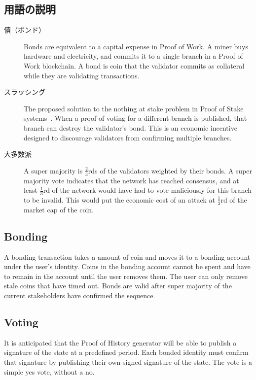 \documentclass[12pt]{ltjsarticle}
\begin{document}
\subsection{用語の説明}
\begin{description}

\item[債（ボンド）]
Bonds are equivalent to a capital expense in Proof of Work. A miner buys hardware and electricity, and commits it to a single branch in a Proof of Work blockchain. A bond is coin that the validator commits as collateral while they are validating transactions.

\item[スラッシング]

The proposed solution to the nothing at stake problem in Proof of Stake systems~\cite{slasher}. When a proof of voting for a different branch is published, that branch can destroy the validator’s bond. This is an economic incentive designed to discourage validators from confirming multiple branches.
\item[大多数派]
A super majority is \(\frac{2}{3}\)rds of the validators weighted by their bonds. A super majority vote indicates that the network has reached consensus, and at least \(\frac{1}{3}\)rd of the network would have had to vote maliciously for this branch to be invalid. This would put the economic cost of an attack at \(\frac{1}{3}\)rd of the market cap of the coin.

\end{description}

\subsection{Bonding}
A bonding transaction takes a  amount of coin and moves it to a bonding account under the user’s identity. Coins in the bonding account cannot be spent and have to remain in the account until the user removes them. The user can only remove stale coins that have timed out. Bonds are valid after super majority of the current stakeholders have confirmed the sequence.

\subsection{Voting}
It is anticipated that the Proof of History generator will be able to publish a signature of the state at a predefined period. Each bonded identity must confirm that signature by publishing their own signed signature of the state. The vote is a simple yes vote, without a no.
\end{document}
